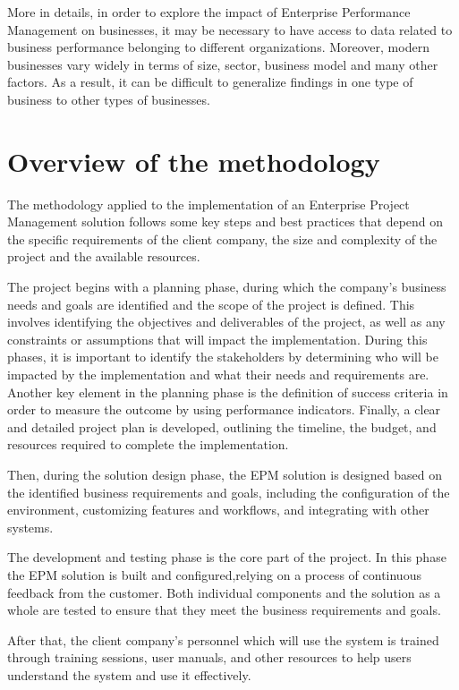 \documentclass[12pt,a4paper,openright,twoside]{book}
\begin{document}
More in details, in order to explore the impact of Enterprise Performance Management on businesses, it may be necessary to have access to data related to business performance belonging to different organizations.
%
Moreover, modern businesses vary widely in terms of size, sector, business model and many other factors.
%
As a result, it can be difficult to generalize findings in one type of business to other types of businesses.

\section{Overview of the methodology}

The methodology applied to the implementation of an Enterprise Project Management solution follows some key steps and best practices that depend on the specific requirements of the client company, the size and complexity of the project and the available resources.

The project begins with a planning phase, during which the company's business needs and goals are identified and the scope of the project is defined.
%
This involves identifying the objectives and deliverables of the project, as well as any constraints or assumptions that will impact the implementation.
%
During this phases, it is important to identify the stakeholders by determining who will be impacted by the implementation and what their needs and requirements are.
%
Another key element in the planning phase is the definition of success criteria in order to measure the outcome by using performance indicators.
%
Finally, a clear and detailed project plan is developed, outlining the timeline, the budget, and resources required to complete the implementation.

Then, during the solution design phase, the EPM solution is designed based on the identified business requirements and goals, including the configuration of the environment, customizing features and workflows, and integrating with other systems.

The development and testing phase is the core part of the project.
%
In this phase the EPM solution is built and configured,relying on a process of continuous feedback from the customer.
%
Both individual components and the solution as a whole are tested to ensure that they meet the business requirements and goals.

After that, the client company's personnel which will use the system is trained through training sessions, user manuals, and other resources to help users understand the system and use it effectively.
\end{document}
